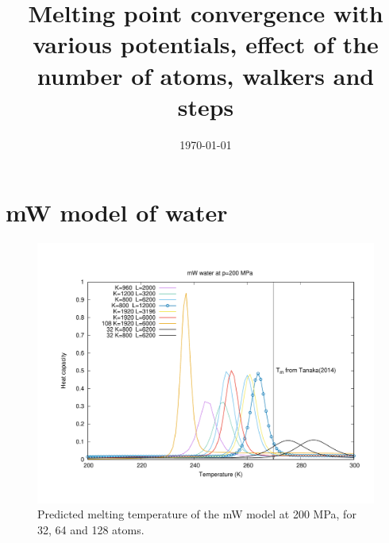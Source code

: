 \documentclass[aps,jcp,preprint,superscriptaddress]{revtex4}
\begin{document}
\title{
Melting point convergence with various potentials, effect of the number of atoms, walkers and steps}


\author{}
\affiliation{}
\email{}

\date{\today}

\maketitle

%
%
\section{mW model of water}
\begin{figure}[hbt]
\begin{center}
\includegraphics[width=14cm]{mW-fig.pdf}
\end{center}
\vspace{-20pt}
\caption {Predicted melting temperature of the mW model at 200 MPa, for 32, 64 and 128 atoms.}
\label{fig:mW}
\end{figure}
\end{document}

